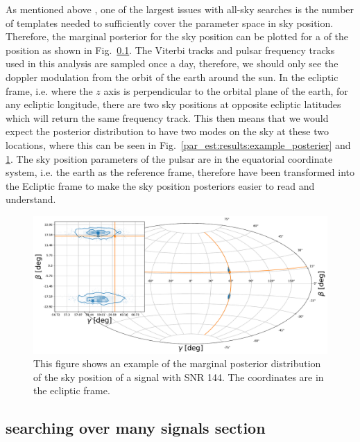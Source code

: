 As mentioned above , one of the largest issues with all-sky searches is the number of templates needed to sufficiently cover the parameter space in sky position. 
Therefore, the marginal posterior for the sky position can be plotted for a  of the position as shown in Fig.~\ref{}.
The Viterbi tracks and pulsar frequency tracks used in this analysis are sampled once a day, therefore, we should only see the doppler modulation from the orbit of the earth around the sun.
In the ecliptic frame, i.e. where the $z$ axis is perpendicular to the orbital plane of the earth, for any ecliptic longitude, there are two sky positions at opposite ecliptic latitudes which will return the same frequency track. 
This then means that we would expect the posterior distribution to have two modes on the sky at these two locations, where this can be seen in Fig.~\ref{par_est:results:example_posterier} and \ref{par_est:results:example_skypos}.
The sky position parameters of the pulsar are in the equatorial coordinate system, i.e. the earth as the reference frame, therefore have been transformed into the Ecliptic frame to make the sky position posteriors easier to read and understand.
%
\begin{figure}
    \centering
    \includegraphics[width=\linewidth]{C5_parameter/skypos_ecliptic.pdf}
    \caption[Example of posterior of sky position]{This figure shows an example of the marginal posterior distribution of the sky position of a signal with \gls{SNR} 144. The coordinates are in the ecliptic frame.}
    \label{par_est:results:example_skypos}
    
\end{figure}
%

\subsection{searching over many signals section }

